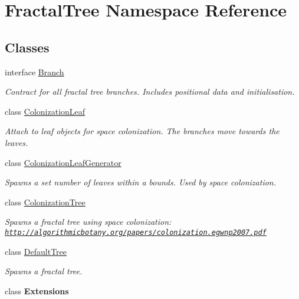 \hypertarget{namespace_fractal_tree}{}\section{Fractal\+Tree Namespace Reference}
\label{namespace_fractal_tree}
\subsection*{Classes}
\begin{DoxyCompactItemize}
\item 
interface \hyperlink{interface_fractal_tree_1_1_branch}{Branch}
\begin{DoxyCompactList}\small\item\em Contract for all fractal tree branches. Includes positional data and initialisation. \end{DoxyCompactList}\item 
class \hyperlink{class_fractal_tree_1_1_colonization_leaf}{Colonization\+Leaf}
\begin{DoxyCompactList}\small\item\em Attach to leaf objects for space colonization. The branches move towards the leaves. \end{DoxyCompactList}\item 
class \hyperlink{class_fractal_tree_1_1_colonization_leaf_generator}{Colonization\+Leaf\+Generator}
\begin{DoxyCompactList}\small\item\em Spawns a set number of leaves within a bounds. Used by space colonization. \end{DoxyCompactList}\item 
class \hyperlink{class_fractal_tree_1_1_colonization_tree}{Colonization\+Tree}
\begin{DoxyCompactList}\small\item\em Spawns a fractal tree using space colonization\+: \href{http://algorithmicbotany.org/papers/colonization.egwnp2007.pdf}{\tt http\+://algorithmicbotany.\+org/papers/colonization.\+egwnp2007.\+pdf} \end{DoxyCompactList}\item 
class \hyperlink{class_fractal_tree_1_1_default_tree}{Default\+Tree}
\begin{DoxyCompactList}\small\item\em Spawns a fractal tree. \end{DoxyCompactList}\item 
class {\bfseries Extensions}

\end{DoxyCompactItemize}
